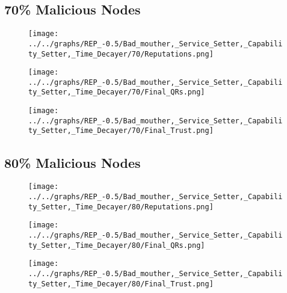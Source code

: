 \begin{minipage}[t]{0.49\columnwidth}
\subsection*{70\% Malicious Nodes}
    \begin{figure}[H]
        \centering
        \texttt{[image: ../../graphs/REP\_-0.5/Bad\_mouther,\_Service\_Setter,\_Capability\_Setter,\_Time\_Decayer/70/Reputations.png]}
    \end{figure}
    \begin{figure}[H]
        \centering
        \texttt{[image: ../../graphs/REP\_-0.5/Bad\_mouther,\_Service\_Setter,\_Capability\_Setter,\_Time\_Decayer/70/Final\_QRs.png]}
    \end{figure}
\end{minipage}
\begin{minipage}[t]{0.49\columnwidth}
    \begin{figure}[H]
        \centering
        \texttt{[image: ../../graphs/REP\_-0.5/Bad\_mouther,\_Service\_Setter,\_Capability\_Setter,\_Time\_Decayer/70/Final\_Trust.png]}
    \end{figure}
\end{minipage}

\begin{minipage}[t]{0.49\columnwidth}
\subsection*{80\% Malicious Nodes}
    \begin{figure}[H]
        \centering
        \texttt{[image: ../../graphs/REP\_-0.5/Bad\_mouther,\_Service\_Setter,\_Capability\_Setter,\_Time\_Decayer/80/Reputations.png]}
    \end{figure}
    \begin{figure}[H]
        \centering
        \texttt{[image: ../../graphs/REP\_-0.5/Bad\_mouther,\_Service\_Setter,\_Capability\_Setter,\_Time\_Decayer/80/Final\_QRs.png]}
    \end{figure}
\end{minipage}
\begin{minipage}[t]{0.49\columnwidth}
    \begin{figure}[H]
        \centering
        \texttt{[image: ../../graphs/REP\_-0.5/Bad\_mouther,\_Service\_Setter,\_Capability\_Setter,\_Time\_Decayer/80/Final\_Trust.png]}
    \end{figure}
\end{minipage}
